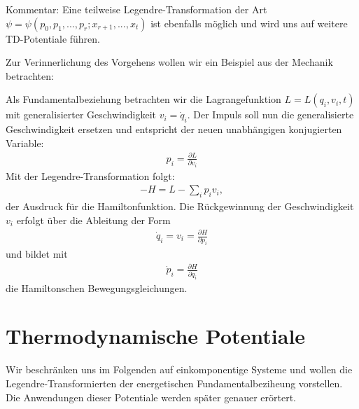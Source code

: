 Kommentar: Eine teilweise Legendre-Transformation der Art $\psi=\psi(p_0,p_1,...,p_r;x_{r+1},...,x_t)$ ist ebenfalls möglich und wird uns auf weitere TD-Potentiale führen.

Zur Verinnerlichung des Vorgehens wollen wir ein Beispiel aus der Mechanik betrachten: 

Als Fundamentalbeziehung betrachten wir die Lagrangefunktion $L=L(q_i,v_i,t)$ mit generalisierter Geschwindigkeit $v_i=\dot{q}_i$.
Der Impuls soll nun die generalisierte Geschwindigkeit ersetzen und entspricht der neuen unabhängigen konjugierten Variable:
\begin{align*}
    p_i=\frac{\partial L}{\partial v_i}
\end{align*}
Mit der Legendre-Transformation folgt:
\begin{align*}
    \boxed{-H=L-\sum_i p_iv_i},
\end{align*}
der Ausdruck für die Hamiltonfunktion.
Die Rückgewinnung der Geschwindigkeit $v_i$ erfolgt über die Ableitung der Form
\begin{align*}
    \dot{q}_i=v_i=\frac{\partial H}{\partial p_i}
\end{align*}
und bildet mit 
\begin{align*}
    \dot{p}_i=\frac{\partial H}{\partial q_i}
\end{align*}
die Hamiltonschen Bewegungsgleichungen.

\section*{Thermodynamische Potentiale}
Wir beschränken uns im Folgenden auf einkomponentige Systeme und wollen die Legendre-Transformierten der energetischen Fundamentalbeziheung vorstellen. Die Anwendungen dieser Potentiale werden später genauer erörtert.


